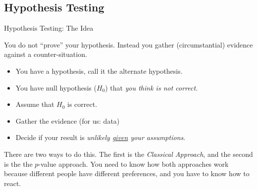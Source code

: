 \subsection{Hypothesis Testing}

\begin{frame}{Hypothesis Testing: The Idea}

  You do not ``prove'' your hypothesis. Instead you gather
  (circumstantial) evidence against a counter-situation.

  \begin{itemize}
  \item You have a hypothesis, call it the alternate hypothesis.
  \item You have null hypothesis ($H_0$) that \textit{\color{red}you think is not correct}.
  \item Assume that $H_0$ is correct.
  \item Gather the evidence (for us: data)
  \item Decide if your result is \textit{\color{red}unlikely \underline{given}
      your assumptions}.
  \end{itemize}

  {

    There are two ways to do this. The first is the \textit{Classical
      Approach}, and the second is the the $p$-value approach. You
    need to know how both approaches work because different people
    have different preferences, and you have to know how to react.

  }

\end{frame}

